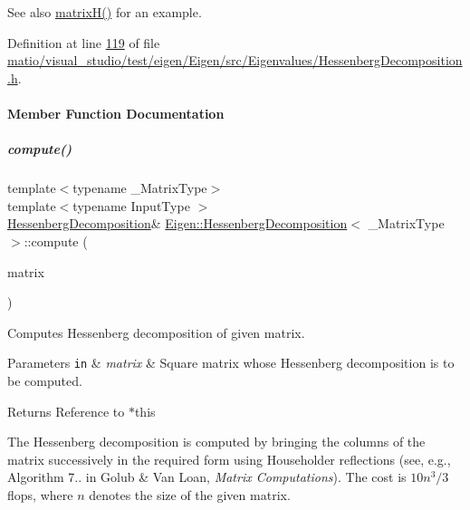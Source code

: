 \begin{DoxySeeAlso}{See also}
\hyperlink{group___eigenvalues___module_a8e781d2e22a2304647bcf0ae913cc8ea}{matrix\+H()} for an example. 
\end{DoxySeeAlso}


Definition at line \hyperlink{matio_2visual__studio_2test_2eigen_2_eigen_2src_2_eigenvalues_2_hessenberg_decomposition_8h_source_l00119}{119} of file \hyperlink{matio_2visual__studio_2test_2eigen_2_eigen_2src_2_eigenvalues_2_hessenberg_decomposition_8h_source}{matio/visual\+\_\+studio/test/eigen/\+Eigen/src/\+Eigenvalues/\+Hessenberg\+Decomposition.\+h}.



\paragraph{Member Function Documentation}
\mbox{\label{group___eigenvalues___module_a239a6fd42c57aab3c0b048c47fde3004}} 
\subparagraph{\texorpdfstring{compute()}{compute()}\hspace{0.1cm}{\footnotesize\ttfamily [1/2]}}
{\footnotesize\ttfamily template$<$typename \+\_\+\+Matrix\+Type$>$ \\
template$<$typename Input\+Type $>$ \\
\hyperlink{group___eigenvalues___module_class_eigen_1_1_hessenberg_decomposition}{Hessenberg\+Decomposition}\& \hyperlink{group___eigenvalues___module_class_eigen_1_1_hessenberg_decomposition}{Eigen\+::\+Hessenberg\+Decomposition}$<$ \+\_\+\+Matrix\+Type $>$\+::compute (\begin{DoxyParamCaption}\item[{const \hyperlink{group___core___module_struct_eigen_1_1_eigen_base}{Eigen\+Base}$<$ Input\+Type $>$ \&}]{matrix }\end{DoxyParamCaption})\hspace{0.3cm}{\ttfamily [inline]}}



Computes Hessenberg decomposition of given matrix. 


\begin{DoxyParams}[1]{Parameters}
\mbox{\tt in}  & {\em matrix} & Square matrix whose Hessenberg decomposition is to be computed. \\
\hline
\end{DoxyParams}
\begin{DoxyReturn}{Returns}
Reference to {\ttfamily $\ast$this} 
\end{DoxyReturn}
The Hessenberg decomposition is computed by bringing the columns of the matrix successively in the required form using Householder reflections (see, e.\+g., Algorithm 7.. in Golub \& Van Loan, {\itshape Matrix Computations}). The cost is $ 10n^3/3 $ flops, where $ n $ denotes the size of the given matrix.

